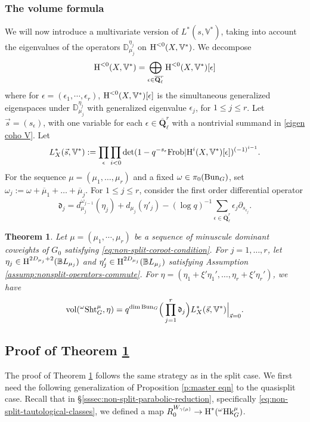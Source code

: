 \documentclass[reqno]{amsart}
\numberwithin{equation}{subsection}
\newtheorem{theorem}[subsubsection]{Theorem}
\theoremstyle{definition}
\def\BB{\mathbb{B}}
\def\DD{\mathbb{D}}
\def\VV{\mathbb{V}}
\newcommand\frd{\mathfrak{d}}
\newcommand{\Bun}{\textup{Bun}}
\newcommand\Frob{\textup{Frob}}
\newcommand\Hk{\mathrm{Hk}}
\newcommand\Sht{\textup{Sht}}
\newcommand{\vol}{\textup{vol}}
\newcommand{\Qlbar}{\overline{\Q}_\ell}
\newcommand{\cohog}[2]{\textup{H}^{#1}({#2})}     %
\newcommand{\e}{\epsilon}
\newcommand{\y}{\eta}
\newcommand{\om}{\omega}
\newcommand\pl{\partial}
\newcommand{\Q}{\mathbf{Q}}
\newcommand{\ol}[1]{\overline{#1}}
\begin{document}
\subsubsection{The volume formula} We will now introduce a multivariate version of $L^{*}(s,\VV^{*})$, taking into account the eigenvalues of the operators $\DD^{\y_{j}}_{\mu_j}$ on $\cohog{<0}{X,\VV^{*}}$. We decompose 
\begin{equation}\label{eigen coho V}
\cohog{<0}{X,\VV^{*}}=\bigoplus_{\e\in\Qlbar^{r}}\cohog{<0}{X,\VV^{*}}[\e]
\end{equation}
where for $\e=(\e_{1},\cdots, \e_{r})$, $\cohog{<0}{X,\VV^{*}}[\e]$ is the simultaneous generalized eigenspaces under $\DD^{\y_{j}}_{\mu_j}$ with generalized eigenvalue $\e_{j}$, for $1\le j\le r$. Let $\vec{s}=(s_{\e})$, with one variable for each $\e\in \Qlbar^{r}$ with a nontrivial summand in \eqref{eigen coho V}. Let
\begin{equation*}
L^{*}_{X}(\vec{s}, \VV^{*}):=\prod_{\e}\prod_{i<0}\det(1-q^{-s_{\e}}\Frob|\cohog{i}{X,\VV^{*}}[\e])^{(-1)^{i-1}}.
\end{equation*}
For the sequence $\mu = (\mu_1, \ldots, \mu_r)$ and a fixed $\omega \in \pi_0(\Bun_G)$, set $\omega_j :=\omega + \ol\mu_1 + \ldots + \ol\mu_j$. For $1\le j\le r$, consider the first order differential operator 
\begin{equation*}
\frd_{j}=d^{\om_{j-1}}_{\mu_j}(\y_{j})+d_{\mu_j}(\y'_{j})-(\log q)^{-1}\sum_{\e\in \Qlbar^{r}}\e_j \pl_{s_{\e_j}}.
\end{equation*}
 
 
\begin{theorem}\label{thm:non-split-volume}
Let $\mu = (\mu_{1},\cdots, \mu_{r})$ be a sequence of minuscule dominant coweights of $G_{0}$ satisfying \eqref{eq:non-split-coroot-condition}. For $j=1, \ldots, r$, let $\y_{j}\in \cohog{2D_{\mu_j}+2}{\BB L_{\mu_j}}$ and $\y'_{j}\in \cohog{2D_{\mu_j}}{\BB L_{\mu_j}}$ satisfying Assumption \ref{assump:nonsplit-operators-commute}. For $\eta = (\eta_1+\xi' \eta_1', \ldots, \eta_r+\xi' \eta_r')$, we have
\begin{equation*}
\vol({}^{\om}\Sht^{\mu}_{G}, \eta) =q^{\dim \Bun_{G}} \Big( \prod_{j=1}^{r}\frd_{j} \Big)L^{*}_{X}(\vec{s}, \VV^{*})\Big|_{\vec{s}=0}.
\end{equation*}
\end{theorem}

\subsection{Proof of Theorem \ref{thm:non-split-volume}}
The proof of Theorem \ref{thm:non-split-volume} follows the same strategy as in the split case. We first need the following generalization of Proposition \ref{p:master eqn} to the quasisplit case. Recall that in \S \ref{sssec:non-split-parabolic-reduction}, specifically \eqref{eq:non-split-tautological-classes}, we defined a map $R_0^{W_{\gamma(\mu)}} \rightarrow \cohog{*}{{}^\omega \Hk_G^\mu}$. 
\end{document}

